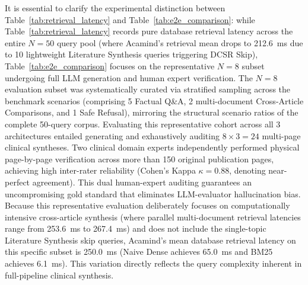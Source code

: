 \documentclass[10pt]{SPIIRAS_Proceedings}
\begin{document}
It is essential to clarify the experimental distinction between Table~\ref{tab:retrieval_latency} and Table~\ref{tab:e2e_comparison}: while Table~\ref{tab:retrieval_latency} records pure database retrieval latency across the entire $N = 50$ query pool (where Acamind's retrieval mean drops to 212.6~ms due to 10 lightweight Literature Synthesis queries triggering DCSR Skip), Table~\ref{tab:e2e_comparison} focuses on the representative $N = 8$ subset undergoing full LLM generation and human expert verification. The $N = 8$ evaluation subset was systematically curated via stratified sampling across the benchmark scenarios (comprising 5 Factual Q\&A, 2 multi-document Cross-Article Comparisons, and 1 Safe Refusal), mirroring the structural scenario ratios of the complete 50-query corpus. Evaluating this representative cohort across all 3 architectures entailed generating and exhaustively auditing $8 \times 3 = 24$ multi-page clinical syntheses. Two clinical domain experts independently performed physical page-by-page verification across more than 150 original publication pages, achieving high inter-rater reliability (Cohen's Kappa $\kappa = 0.88$, denoting near-perfect agreement). This dual human-expert auditing guarantees an uncompromising gold standard that eliminates LLM-evaluator hallucination bias. Because this representative evaluation deliberately focuses on computationally intensive cross-article synthesis (where parallel multi-document retrieval latencies range from 253.6~ms to 267.4~ms) and does not include the single-topic Literature Synthesis skip queries, Acamind's mean database retrieval latency on this specific subset is 250.0~ms (Naive Dense achieves 65.0~ms and BM25 achieves 6.1~ms). This variation directly reflects the query complexity inherent in full-pipeline clinical synthesis.

\begin{table}[H]
\centering
\caption{End-to-End Empirical Comparison of 3 Architectures on Representative Clinical Scenarios ($N = 8$)}
\label{tab:e2e_comparison}
\end{table}
\end{document}
